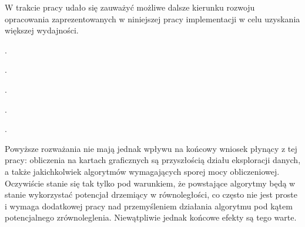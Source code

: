 \documentclass[12pt]{article}
\begin{document}
W trakcie pracy udało się zauważyć możliwe dalsze kierunku rozwoju opracowania zaprezentowanych w niniejszej pracy implementacji w celu uzyskania większej wydajności.

.

.

.

.

.

Powyższe rozważania nie mają jednak wpływu na końcowy wniosek płynący z tej pracy: obliczenia na kartach graficznych są przyszłością działu eksploracji danych, a także jakichkolwiek algorytmów wymagających sporej mocy obliczeniowej. Oczywiście stanie się tak tylko pod warunkiem, że powstające algorytmy będą w stanie wykorzystać potencjał drzemiący w równoległości, co często nie jest proste i wymaga dodatkowej pracy nad przemyśleniem działania algorytmu pod kątem potencjalnego zrównoleglenia. Niewątpliwie jednak końcowe efekty są tego warte.
 
\newpage
\end{document}
